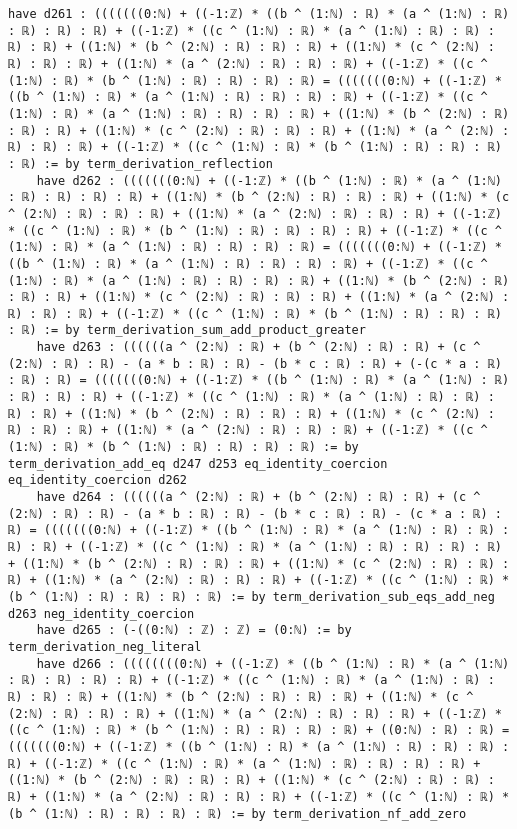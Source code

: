 \documentclass{article}
\begin{document}
\begin{tcolorbox}[colback=white!10, width=\linewidth]
\begin{lstlisting}[language=Lean4]
    have d261 : (((((((0:ℕ) + ((-1:ℤ) * ((b ^ (1:ℕ) : ℝ) * (a ^ (1:ℕ) : ℝ) : ℝ) : ℝ) : ℝ) + ((-1:ℤ) * ((c ^ (1:ℕ) : ℝ) * (a ^ (1:ℕ) : ℝ) : ℝ) : ℝ) : ℝ) + ((1:ℕ) * (b ^ (2:ℕ) : ℝ) : ℝ) : ℝ) + ((1:ℕ) * (c ^ (2:ℕ) : ℝ) : ℝ) : ℝ) + ((1:ℕ) * (a ^ (2:ℕ) : ℝ) : ℝ) : ℝ) + ((-1:ℤ) * ((c ^ (1:ℕ) : ℝ) * (b ^ (1:ℕ) : ℝ) : ℝ) : ℝ) : ℝ) = (((((((0:ℕ) + ((-1:ℤ) * ((b ^ (1:ℕ) : ℝ) * (a ^ (1:ℕ) : ℝ) : ℝ) : ℝ) : ℝ) + ((-1:ℤ) * ((c ^ (1:ℕ) : ℝ) * (a ^ (1:ℕ) : ℝ) : ℝ) : ℝ) : ℝ) + ((1:ℕ) * (b ^ (2:ℕ) : ℝ) : ℝ) : ℝ) + ((1:ℕ) * (c ^ (2:ℕ) : ℝ) : ℝ) : ℝ) + ((1:ℕ) * (a ^ (2:ℕ) : ℝ) : ℝ) : ℝ) + ((-1:ℤ) * ((c ^ (1:ℕ) : ℝ) * (b ^ (1:ℕ) : ℝ) : ℝ) : ℝ) : ℝ) := by term_derivation_reflection
    have d262 : (((((((0:ℕ) + ((-1:ℤ) * ((b ^ (1:ℕ) : ℝ) * (a ^ (1:ℕ) : ℝ) : ℝ) : ℝ) : ℝ) + ((1:ℕ) * (b ^ (2:ℕ) : ℝ) : ℝ) : ℝ) + ((1:ℕ) * (c ^ (2:ℕ) : ℝ) : ℝ) : ℝ) + ((1:ℕ) * (a ^ (2:ℕ) : ℝ) : ℝ) : ℝ) + ((-1:ℤ) * ((c ^ (1:ℕ) : ℝ) * (b ^ (1:ℕ) : ℝ) : ℝ) : ℝ) : ℝ) + ((-1:ℤ) * ((c ^ (1:ℕ) : ℝ) * (a ^ (1:ℕ) : ℝ) : ℝ) : ℝ) : ℝ) = (((((((0:ℕ) + ((-1:ℤ) * ((b ^ (1:ℕ) : ℝ) * (a ^ (1:ℕ) : ℝ) : ℝ) : ℝ) : ℝ) + ((-1:ℤ) * ((c ^ (1:ℕ) : ℝ) * (a ^ (1:ℕ) : ℝ) : ℝ) : ℝ) : ℝ) + ((1:ℕ) * (b ^ (2:ℕ) : ℝ) : ℝ) : ℝ) + ((1:ℕ) * (c ^ (2:ℕ) : ℝ) : ℝ) : ℝ) + ((1:ℕ) * (a ^ (2:ℕ) : ℝ) : ℝ) : ℝ) + ((-1:ℤ) * ((c ^ (1:ℕ) : ℝ) * (b ^ (1:ℕ) : ℝ) : ℝ) : ℝ) : ℝ) := by term_derivation_sum_add_product_greater
    have d263 : ((((((a ^ (2:ℕ) : ℝ) + (b ^ (2:ℕ) : ℝ) : ℝ) + (c ^ (2:ℕ) : ℝ) : ℝ) - (a * b : ℝ) : ℝ) - (b * c : ℝ) : ℝ) + (-(c * a : ℝ) : ℝ) : ℝ) = (((((((0:ℕ) + ((-1:ℤ) * ((b ^ (1:ℕ) : ℝ) * (a ^ (1:ℕ) : ℝ) : ℝ) : ℝ) : ℝ) + ((-1:ℤ) * ((c ^ (1:ℕ) : ℝ) * (a ^ (1:ℕ) : ℝ) : ℝ) : ℝ) : ℝ) + ((1:ℕ) * (b ^ (2:ℕ) : ℝ) : ℝ) : ℝ) + ((1:ℕ) * (c ^ (2:ℕ) : ℝ) : ℝ) : ℝ) + ((1:ℕ) * (a ^ (2:ℕ) : ℝ) : ℝ) : ℝ) + ((-1:ℤ) * ((c ^ (1:ℕ) : ℝ) * (b ^ (1:ℕ) : ℝ) : ℝ) : ℝ) : ℝ) := by term_derivation_add_eq d247 d253 eq_identity_coercion eq_identity_coercion d262
    have d264 : ((((((a ^ (2:ℕ) : ℝ) + (b ^ (2:ℕ) : ℝ) : ℝ) + (c ^ (2:ℕ) : ℝ) : ℝ) - (a * b : ℝ) : ℝ) - (b * c : ℝ) : ℝ) - (c * a : ℝ) : ℝ) = (((((((0:ℕ) + ((-1:ℤ) * ((b ^ (1:ℕ) : ℝ) * (a ^ (1:ℕ) : ℝ) : ℝ) : ℝ) : ℝ) + ((-1:ℤ) * ((c ^ (1:ℕ) : ℝ) * (a ^ (1:ℕ) : ℝ) : ℝ) : ℝ) : ℝ) + ((1:ℕ) * (b ^ (2:ℕ) : ℝ) : ℝ) : ℝ) + ((1:ℕ) * (c ^ (2:ℕ) : ℝ) : ℝ) : ℝ) + ((1:ℕ) * (a ^ (2:ℕ) : ℝ) : ℝ) : ℝ) + ((-1:ℤ) * ((c ^ (1:ℕ) : ℝ) * (b ^ (1:ℕ) : ℝ) : ℝ) : ℝ) : ℝ) := by term_derivation_sub_eqs_add_neg d263 neg_identity_coercion
    have d265 : (-((0:ℕ) : ℤ) : ℤ) = (0:ℕ) := by term_derivation_neg_literal
    have d266 : ((((((((0:ℕ) + ((-1:ℤ) * ((b ^ (1:ℕ) : ℝ) * (a ^ (1:ℕ) : ℝ) : ℝ) : ℝ) : ℝ) + ((-1:ℤ) * ((c ^ (1:ℕ) : ℝ) * (a ^ (1:ℕ) : ℝ) : ℝ) : ℝ) : ℝ) + ((1:ℕ) * (b ^ (2:ℕ) : ℝ) : ℝ) : ℝ) + ((1:ℕ) * (c ^ (2:ℕ) : ℝ) : ℝ) : ℝ) + ((1:ℕ) * (a ^ (2:ℕ) : ℝ) : ℝ) : ℝ) + ((-1:ℤ) * ((c ^ (1:ℕ) : ℝ) * (b ^ (1:ℕ) : ℝ) : ℝ) : ℝ) : ℝ) + ((0:ℕ) : ℝ) : ℝ) = (((((((0:ℕ) + ((-1:ℤ) * ((b ^ (1:ℕ) : ℝ) * (a ^ (1:ℕ) : ℝ) : ℝ) : ℝ) : ℝ) + ((-1:ℤ) * ((c ^ (1:ℕ) : ℝ) * (a ^ (1:ℕ) : ℝ) : ℝ) : ℝ) : ℝ) + ((1:ℕ) * (b ^ (2:ℕ) : ℝ) : ℝ) : ℝ) + ((1:ℕ) * (c ^ (2:ℕ) : ℝ) : ℝ) : ℝ) + ((1:ℕ) * (a ^ (2:ℕ) : ℝ) : ℝ) : ℝ) + ((-1:ℤ) * ((c ^ (1:ℕ) : ℝ) * (b ^ (1:ℕ) : ℝ) : ℝ) : ℝ) : ℝ) := by term_derivation_nf_add_zero

\end{lstlisting}
\end{tcolorbox}
\end{document}
